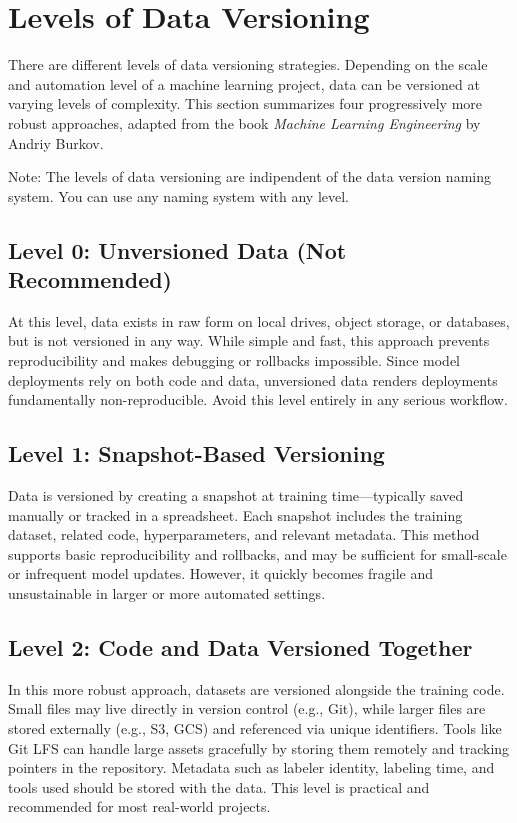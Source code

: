 \documentclass[12pt,openany]{book}
\begin{document}
\section{Levels of Data Versioning}

There are different levels of data versioning strategies. Depending on the scale and automation level of a machine learning project, data can be versioned at varying levels of complexity. This section summarizes four progressively more robust approaches, adapted from the book \textit{Machine Learning Engineering} by Andriy Burkov. \newline

Note: The levels of data versioning are indipendent of the data version naming system. You can use any naming system with any level.


\subsection*{Level 0: Unversioned Data (Not Recommended)}

At this level, data exists in raw form on local drives, object storage, or databases, but is not versioned in any way. While simple and fast, this approach prevents reproducibility and makes debugging or rollbacks impossible. Since model deployments rely on both code and data, unversioned data renders deployments fundamentally non-reproducible. Avoid this level entirely in any serious workflow.


\subsection*{Level 1: Snapshot-Based Versioning}

Data is versioned by creating a snapshot at training time—typically saved manually or tracked in a spreadsheet. Each snapshot includes the training dataset, related code, hyperparameters, and relevant metadata. This method supports basic reproducibility and rollbacks, and may be sufficient for small-scale or infrequent model updates. However, it quickly becomes fragile and unsustainable in larger or more automated settings.


\subsection*{Level 2: Code and Data Versioned Together}

In this more robust approach, datasets are versioned alongside the training code. Small files may live directly in version control (e.g., Git), while larger files are stored externally (e.g., S3, GCS) and referenced via unique identifiers. Tools like Git LFS can handle large assets gracefully by storing them remotely and tracking pointers in the repository. Metadata such as labeler identity, labeling time, and tools used should be stored with the data. This level is practical and recommended for most real-world projects.
\end{document}
